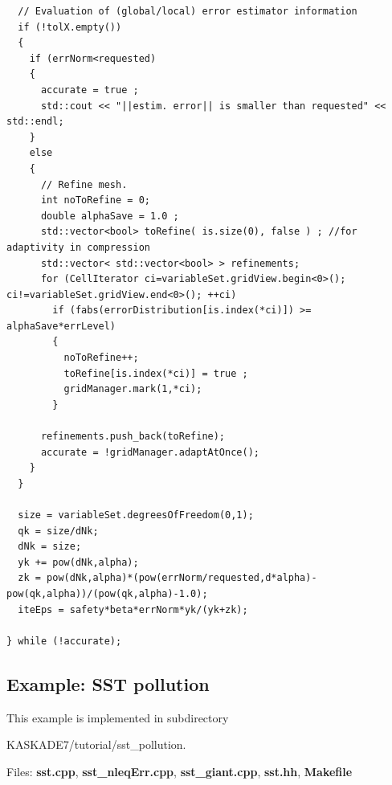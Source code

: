 \documentclass[11pt]{article}
\begin{document}
\begin{lstlisting}
  // Evaluation of (global/local) error estimator information 
  if (!tolX.empty())
  {
    if (errNorm<requested)
    {
      accurate = true ;
      std::cout << "||estim. error|| is smaller than requested" << std::endl;
    }
    else
    {
      // Refine mesh.
      int noToRefine = 0;
      double alphaSave = 1.0 ;
      std::vector<bool> toRefine( is.size(0), false ) ; //for adaptivity in compression
      std::vector< std::vector<bool> > refinements;
      for (CellIterator ci=variableSet.gridView.begin<0>(); ci!=variableSet.gridView.end<0>(); ++ci)
        if (fabs(errorDistribution[is.index(*ci)]) >= alphaSave*errLevel)
        {
          noToRefine++;
          toRefine[is.index(*ci)] = true ;
          gridManager.mark(1,*ci);
        }

      refinements.push_back(toRefine);
      accurate = !gridManager.adaptAtOnce();
    }
  }
    
  size = variableSet.degreesOfFreedom(0,1);
  qk = size/dNk;
  dNk = size;
  yk += pow(dNk,alpha);
  zk = pow(dNk,alpha)*(pow(errNorm/requested,d*alpha)-pow(qk,alpha))/(pow(qk,alpha)-1.0);
  iteEps = safety*beta*errNorm*yk/(yk+zk);
    
} while (!accurate);
\end{lstlisting}

\subsection{Example: SST pollution}\label{SST}
This example is implemented in subdirectory 
\begin{center} KASKADE7/tutorial/sst\_pollution.\end{center}

\noindent Files: {\bf sst.cpp}, {\bf sst\_nleqErr.cpp}, {\bf sst\_giant.cpp}, {\bf sst.hh}, {\bf Makefile}
\end{document}
